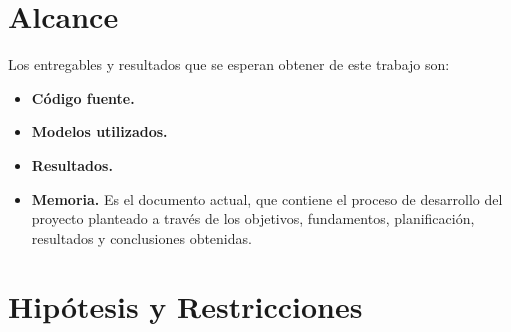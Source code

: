 \section{Alcance}
Los entregables y resultados que se esperan obtener de este trabajo son:
\begin{itemize}
    \item \textbf{Código fuente.}
    \item \textbf{Modelos utilizados.}
    \item \textbf{Resultados.} 
    \item \textbf{Memoria.} Es el documento actual, que contiene el proceso de desarrollo del proyecto planteado a través de los objetivos, fundamentos, planificación, resultados y conclusiones obtenidas.
\end{itemize}

\section{Hipótesis y Restricciones}


